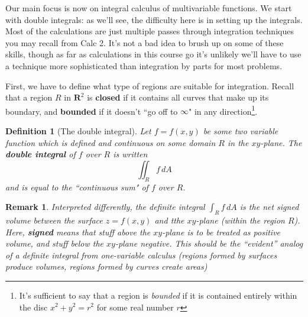 \documentclass[12pt]{article}
\numberwithin{equation}{subsection}
\numberwithin{figure}{subsection}
\newtheorem{defn}[subsection]{Definition}
\theoremstyle{note}
\newtheorem{remark}[subsection]{Remark}
\begin{document}
{Our main focus is now on integral calculus of multivariable functions. We start with double integrals: as we'll see, the difficulty here is in setting up the integrals. Most of the calculations are just multiple passes through integration techniques you may recall from Calc 2. It's not a bad idea to brush up on some of these skills, though as far as calculations in this course go it's unlikely we'll have to use a technique more sophisticated than integration by parts for most problems. 


First, we have to define what type of regions are suitable for integration. Recall that a region $R$ in $\mathbf{R}^2$ is \textbf{closed} if it contains all curves that make up its boundary, and \textbf{bounded} if it doesn't ``go off to $\infty$" in any direction\footnote{It's sufficient to say that a region is \textit{bounded} if it is contained entirely within the disc $x^2+y^2=r^2$ for some real number $r$}. 


\begin{defn}[The double integral] Let $f=f(x,y)$ be some two variable function which is defined and continuous on some domain $R$ in the $xy$-plane. The \textbf{double integral} of $f$ over $R$ is written \begin{equation} \iint_R f\,dA \label{int-dA} \end{equation} 
and is equal to the ``continuous sum" of $f$ over $R$.\end{defn}

\begin{remark}
Interpreted differently, the definite integral $\int_R f\,dA$ is the \textit{net signed volume} between the surface $z=f(x,y)$ and tthe $xy$-plane (within the region $R$). Here, \textbf{signed} means that stuff above the $xy$-plane is to be treated as positive volume, and stuff below the $xy$-plane negative. This should be the ``evident'' analog of a definite integral from one-variable calculus (regions formed by surfaces produce \textit{volumes}, regions formed by curves create \textit{areas})



\end{remark}}
\end{document}
